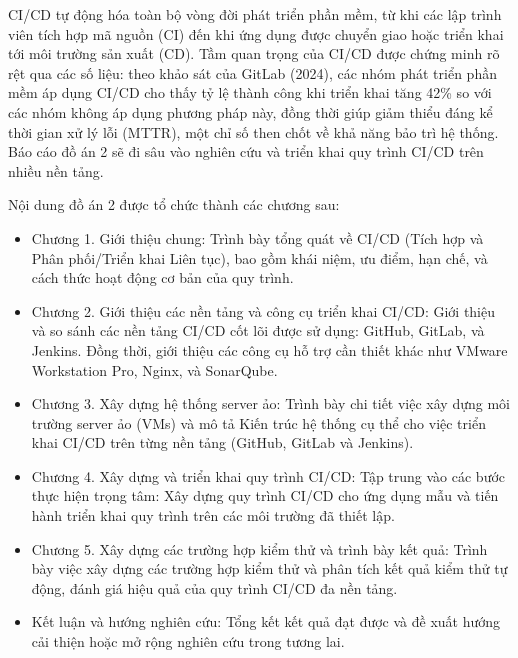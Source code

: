 CI/CD tự động hóa toàn bộ vòng đời phát triển phần mềm, từ khi các lập trình viên tích hợp mã nguồn (CI) đến khi ứng dụng được chuyển giao hoặc triển khai tới môi trường sản xuất (CD). Tầm quan trọng của CI/CD được chứng minh rõ rệt qua các số liệu: theo khảo sát của GitLab (2024), các nhóm phát triển phần mềm áp dụng CI/CD cho thấy tỷ lệ thành công khi triển khai tăng 42\% so với các nhóm không áp dụng phương pháp này, đồng thời giúp giảm thiểu đáng kể thời gian xử lý lỗi (MTTR), một chỉ số then chốt về khả năng bảo trì hệ thống. Báo cáo đồ án 2 sẽ đi sâu vào nghiên cứu và triển khai quy trình CI/CD trên nhiều nền tảng. 

%
%
%
%

Nội dung đồ án 2 được tổ chức thành các chương sau:

\begin{itemize}
	\item Chương 1. Giới thiệu chung: Trình bày tổng quát về CI/CD (Tích hợp và Phân phối/Triển khai Liên tục), bao gồm khái niệm, ưu điểm, hạn chế, và cách thức hoạt động cơ bản của quy trình.
	
	\item Chương 2. Giới thiệu các nền tảng và công cụ triển khai CI/CD: Giới thiệu và so sánh các nền tảng CI/CD cốt lõi được sử dụng: GitHub, GitLab, và Jenkins. Đồng thời, giới thiệu các công cụ hỗ trợ cần thiết khác như VMware Workstation Pro, Nginx, và SonarQube.
	
	\item Chương 3. Xây dựng hệ thống server ảo: Trình bày chi tiết việc xây dựng môi trường server ảo (VMs) và mô tả Kiến trúc hệ thống cụ thể cho việc triển khai CI/CD trên từng nền tảng (GitHub, GitLab và Jenkins).
	
	\item Chương 4. Xây dựng và triển khai quy trình CI/CD: Tập trung vào các bước thực hiện trọng tâm: Xây dựng quy trình CI/CD cho ứng dụng mẫu và tiến hành triển khai quy trình trên các môi trường đã thiết lập.
	
	\item Chương 5. Xây dựng các trường hợp kiểm thử và trình bày kết quả: Trình bày việc xây dựng các trường hợp kiểm thử và phân tích kết quả kiểm thử tự động, đánh giá hiệu quả của quy trình CI/CD đa nền tảng.
	
	\item Kết luận và hướng nghiên cứu: Tổng kết kết quả đạt được và đề xuất hướng cải thiện hoặc mở rộng nghiên cứu trong tương lai.
\end{itemize}


